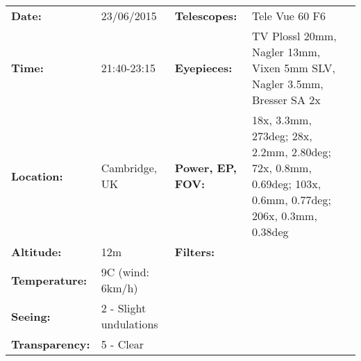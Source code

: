 \begin{tabular}{ p{0.9in} p{1.3in} p{1.2in} p{5.2in}}
{\bf Date:} & 23/06/2015 & {\bf Telescopes:} & Tele Vue 60 F6 \\ 
{\bf Time:} & 21:40-23:15 & {\bf Eyepieces:} & TV Plossl 20mm, Nagler 13mm, Vixen 5mm SLV, Nagler 3.5mm, Bresser SA 2x \\ 
{\bf Location:} & Cambridge, UK & {\bf Power, EP, FOV:} & 18x, 3.3mm, 273deg; 28x, 2.2mm, 2.80deg; 72x, 0.8mm, 0.69deg; 103x, 0.6mm, 0.77deg; 206x, 0.3mm, 0.38deg \\ 
{\bf Altitude:} & 12m & {\bf Filters:} &  \\ 
{\bf Temperature:} & 9C (wind: 6km/h) & & \\ 
{\bf Seeing:} & 2 - Slight undulations & & \\ 
{\bf Transparency:} & 5 - Clear & & \\ 
\end{tabular}
\centering 
